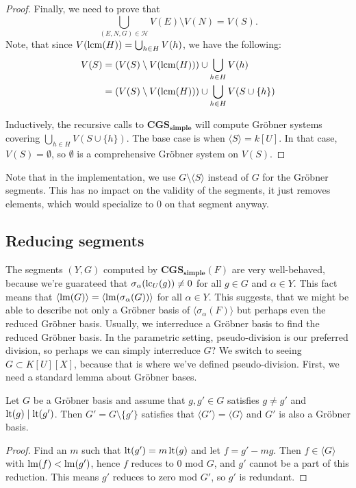 \begin{proof}
  Finally, we need to prove that \[\bigcup_{(E, N, G) \in \mathcal H} V(E) \setminus V(N) = V(S).\]
  Note, that since $V(\operatorname{lcm}(H)) = \bigcup_{h \in H} V(h)$, we have the following:
  \begin{align*}
    V(S) &= (V(S) \setminus V(\operatorname{lcm}(H))) \cup \bigcup_{h \in H} V(h) \\
    &= (V(S) \setminus V(\operatorname{lcm}(H))) \cup \bigcup_{h \in H} V(S \cup \{h\})
  \end{align*}

  Inductively, the recursive calls to $\mathbf{CGS_{simple}}$ will compute Gröbner systems covering $\bigcup_{h \in H} V(S \cup \{h\})$. The base case is when $\langle S \rangle = k[U]$. In that case, $V(S) = \emptyset$, so $\emptyset$ is a comprehensive Gröbner system on $V(S)$.
\end{proof}

Note that in the implementation, we use $G \setminus \langle S \rangle$ instead of $G$ for the Gröbner segments. This has no impact on the validity of the segments, it just removes elements, which would specialize to $0$ on that segment anyway.

\subsection{Reducing segments}
The segments $(Y, G)$ computed by $\mathbf{CGS_{simple}}(F)$ are very well-behaved, because we're guarateed that $\sigma_{\alpha}(\operatorname{lc}_{U}(g)) \neq 0$ for all $g \in G$ and $\alpha \in Y$. This fact means that $\langle \operatorname{lm}(G) \rangle = \langle \operatorname{lm}(\sigma_{\alpha}(G)) \rangle$ for all $\alpha \in Y$. This suggests, that we might be able to describe not only a Gröbner basis of $\langle \sigma_{\alpha}(F) \rangle$ but perhaps even the reduced Gröbner basis. Usually, we interreduce a Gröbner basis to find the reduced Gröbner basis. In the parametric setting, pseudo-division is our preferred division, so perhaps we can simply interreduce $G$? We switch to seeing $G \subset K[U][X]$, because that is where we've defined pseudo-division. First, we need a standard lemma about Gröbner bases.

\begin{lemma}\label{lem:redundant}
  Let $G$ be a Gröbner basis and assume that $g, g' \in G$ satisfies $g \neq g'$ and $\operatorname{lt}(g) \mid \operatorname{lt}(g')$. Then $G' = G \setminus \{g'\}$ satisfies that $\langle G' \rangle = \langle G \rangle$ and $G'$ is also a Gröbner basis.
\end{lemma}
\begin{proof}
  Find an $m$ such that $\operatorname{lt}(g') = m\operatorname{lt}(g)$ and let $f = g' - mg$. Then $f \in \langle G \rangle$ with $\operatorname{lm}(f) < \operatorname{lm}(g')$, hence $f$ reduces to 0 mod $G$, and $g'$ cannot be a part of this reduction. This means $g'$ reduces to zero mod $G'$, so $g'$ is redundant.
\end{proof}


